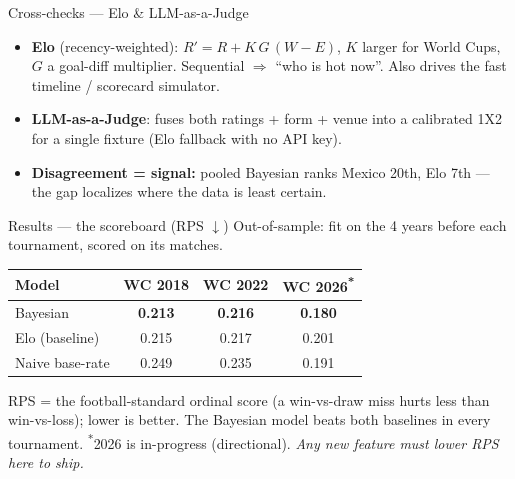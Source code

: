 \documentclass[aspectratio=169]{beamer}
\begin{document}
\begin{frame}{Cross-checks --- Elo \& LLM-as-a-Judge}
\begin{itemize}
  \item \textbf{Elo} (recency-weighted): $R' = R + K\,G\,(W-E)$, $K$ larger for
        World Cups, $G$ a goal-diff multiplier. Sequential $\Rightarrow$ ``who is
        hot now''. Also drives the fast timeline / scorecard simulator.
  \item \textbf{LLM-as-a-Judge}: fuses both ratings + form + venue into a
        calibrated 1X2 for a single fixture (Elo fallback with no API key).
  \item \textbf{Disagreement = signal:} pooled Bayesian ranks Mexico 20th, Elo
        7th --- the gap localizes where the data is least certain.
\end{itemize}
\end{frame}

\begin{frame}{Results --- the scoreboard (RPS $\downarrow$)}
Out-of-sample: fit on the 4 years before each tournament, scored on its matches.
\centering
\begin{tabular}{@{}lccc@{}}
\toprule
Model & WC 2018 & WC 2022 & WC 2026\textsuperscript{*} \\
\midrule
Bayesian        & \textbf{0.213} & \textbf{0.216} & \textbf{0.180} \\
Elo (baseline)  & 0.215 & 0.217 & 0.201 \\
Naive base-rate & 0.249 & 0.235 & 0.191 \\
\bottomrule
\end{tabular}
\vspace{0.8em}
\footnotesize RPS = the football-standard ordinal score (a win-vs-draw miss
hurts less than win-vs-loss); lower is better. The Bayesian model beats both
baselines in every tournament. \textsuperscript{*}2026 is in-progress
(directional). \emph{Any new feature must lower RPS here to ship.}
\end{frame}
\end{document}
